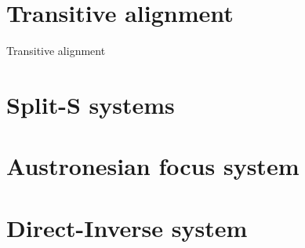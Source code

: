 \documentclass{article}
\begin{document}
\section{Transitive alignment}


Transitive alignment

\section{Split-S systems}

\section{Austronesian focus system}

\section{Direct-Inverse system}



\end{document}
